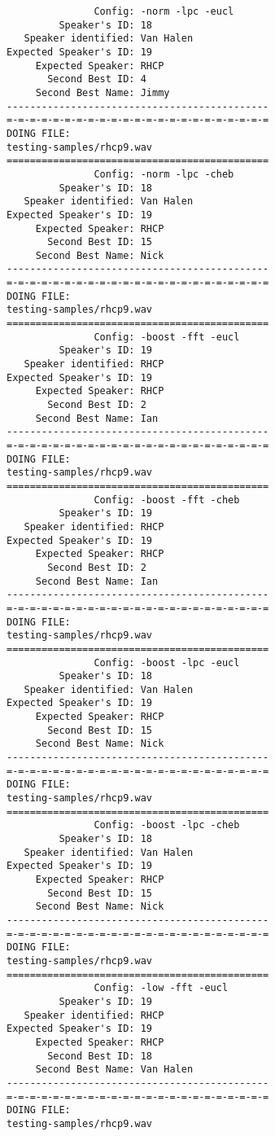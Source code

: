 \begin{verbatim}
               Config: -norm -lpc -eucl
         Speaker's ID: 18
   Speaker identified: Van Halen
Expected Speaker's ID: 19
     Expected Speaker: RHCP
       Second Best ID: 4
     Second Best Name: Jimmy
---------------------------------------------
=-=-=-=-=-=-=-=-=-=-=-=-=-=-=-=-=-=-=-=-=-=-=
DOING FILE:
testing-samples/rhcp9.wav
=============================================
               Config: -norm -lpc -cheb
         Speaker's ID: 18
   Speaker identified: Van Halen
Expected Speaker's ID: 19
     Expected Speaker: RHCP
       Second Best ID: 15
     Second Best Name: Nick
---------------------------------------------
=-=-=-=-=-=-=-=-=-=-=-=-=-=-=-=-=-=-=-=-=-=-=
DOING FILE:
testing-samples/rhcp9.wav
=============================================
               Config: -boost -fft -eucl
         Speaker's ID: 19
   Speaker identified: RHCP
Expected Speaker's ID: 19
     Expected Speaker: RHCP
       Second Best ID: 2
     Second Best Name: Ian
---------------------------------------------
=-=-=-=-=-=-=-=-=-=-=-=-=-=-=-=-=-=-=-=-=-=-=
DOING FILE:
testing-samples/rhcp9.wav
=============================================
               Config: -boost -fft -cheb
         Speaker's ID: 19
   Speaker identified: RHCP
Expected Speaker's ID: 19
     Expected Speaker: RHCP
       Second Best ID: 2
     Second Best Name: Ian
---------------------------------------------
=-=-=-=-=-=-=-=-=-=-=-=-=-=-=-=-=-=-=-=-=-=-=
DOING FILE:
testing-samples/rhcp9.wav
=============================================
               Config: -boost -lpc -eucl
         Speaker's ID: 18
   Speaker identified: Van Halen
Expected Speaker's ID: 19
     Expected Speaker: RHCP
       Second Best ID: 15
     Second Best Name: Nick
---------------------------------------------
=-=-=-=-=-=-=-=-=-=-=-=-=-=-=-=-=-=-=-=-=-=-=
DOING FILE:
testing-samples/rhcp9.wav
=============================================
               Config: -boost -lpc -cheb
         Speaker's ID: 18
   Speaker identified: Van Halen
Expected Speaker's ID: 19
     Expected Speaker: RHCP
       Second Best ID: 15
     Second Best Name: Nick
---------------------------------------------
=-=-=-=-=-=-=-=-=-=-=-=-=-=-=-=-=-=-=-=-=-=-=
DOING FILE:
testing-samples/rhcp9.wav
=============================================
               Config: -low -fft -eucl
         Speaker's ID: 19
   Speaker identified: RHCP
Expected Speaker's ID: 19
     Expected Speaker: RHCP
       Second Best ID: 18
     Second Best Name: Van Halen
---------------------------------------------
=-=-=-=-=-=-=-=-=-=-=-=-=-=-=-=-=-=-=-=-=-=-=
DOING FILE:
testing-samples/rhcp9.wav

\end{verbatim}
